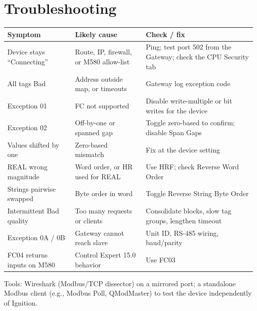 \section{Troubleshooting}
\begin{longtable}{@{}P{4.69cm}P{5.40cm}P{6.81cm}@{}}
\toprule
\textbf{Symptom} & \textbf{Likely cause} & \textbf{Check / fix} \\
\midrule
\endhead
Device stays ``Connecting'' & Route, IP, firewall, or M580 allow-list & Ping; test port 502 from the Gateway; check the CPU Security tab \\
All tags Bad & Address outside map, or timeouts & Gateway log exception code \\
Exception 01 & FC not supported & Disable write-multiple or bit writes for the device \\
Exception 02 & Off-by-one or spanned gap & Toggle zero-based to confirm; disable Span Gaps \\
Values shifted by one & Zero-based mismatch & Fix at the device setting \\
REAL wrong magnitude & Word order, or HR used for REAL & Use HRF; check Reverse Word Order \\
Strings pairwise swapped & Byte order in word & Toggle Reverse String Byte Order \\
Intermittent Bad quality & Too many requests or clients & Consolidate blocks, slow tag groups, lengthen timeout \\
Exception 0A / 0B & Gateway cannot reach slave & Unit ID, RS-485 wiring, baud/parity \\
FC04 returns inputs on M580 & Control Expert 15.0 behavior & Use FC03 \\
\bottomrule
\end{longtable}
Tools: Wireshark (Modbus/TCP dissector) on a mirrored port; a standalone Modbus client (e.g., Modbus Poll, QModMaster) to test the device independently of Ignition.

